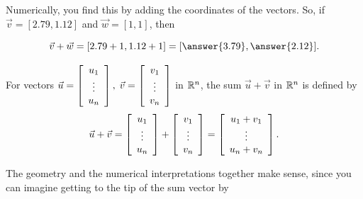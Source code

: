 \documentclass{ximera}
\begin{document}
\begin{example}
\begin{remark}
Numerically, you find this by adding the coordinates of the vectors. So, if $\vec{v}=[2.79,1.12]$ and $\vec{w}=[1,1]$, then 

$$\vec{v}+\vec{w}=[2.79+1,1.12+1]=[\answer{3.79},\answer{2.12}].$$

\begin{definition}
  For vectors $\vec{u}=\startmat{c}
    u_1 \\
    \vdots \\
    u_n
  \stopmat,\; \vec{v}= \startmat{c}
    v_1 \\
    \vdots \\
    v_n
  \stopmat$ in $\R^n$, the sum%
   $\vec{u}+\vec{v}$ in $\R^n$ is defined
  by
  \begin{equation*}
    \vec{u}+\vec{v} = \startmat{c}
      u_1 \\
      \vdots \\
      u_n
    \stopmat +  \startmat{c}
      v_1 \\
      \vdots \\
      v_n
    \stopmat
    = \startmat{c}
      u_1+v_1 \\
      \vdots \\
      u_n+v_n
    \stopmat.
  \end{equation*}
\end{definition}

The geometry and the numerical interpretations together make sense, since you can imagine getting to the tip of the sum vector by 


\end{remark}
\end{example}
\end{document}
